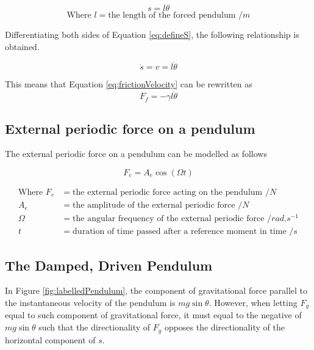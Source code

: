 \documentclass[letterpaper, 12pt]{article}
\begin{document}
\begin{equation} \label{eq:defineS}
    s = l\theta
\end{equation}
\[
    \text{Where } l = \text{the length of the forced pendulum } /\unit{m}
\]

Differentiating both sides of Equation \ref*{eq:defineS},
the following relationship is obtained.

\begin{equation}
    \dot s = v = l \dot \theta
\end{equation}

This means that Equation \ref*{eq:frictionVelocity} can be rewritten as
\begin{equation}
    F_f = -\gamma l \dot\theta
\end{equation}

\subsection{External periodic force on a pendulum}

The external periodic force on a pendulum can be modelled as follows

\begin{equation}
    F_e = A_e \cos (\Omega t)
\end{equation}

\begin{align*}
    \text{Where } F_e & = \text{the external periodic force acting on the pendulum } /\unit{N}
    \\
    A_e               & = \text{the amplitude of the external periodic force } /\unit{N}
    \\
    \Omega            & = \text{the angular frequency of the external periodic force } /\unit{rad.s^{-1}}
    \\
    t                 & = \text{duration of time passed after a reference moment in time } /\unit{s}
\end{align*}

\subsection{The Damped, Driven Pendulum}

In Figure \ref*{fig:labelledPendulum}, the component of
gravitational force parallel to the instantaneous velocity of
the pendulum is \(mg\sin\theta\). However, when letting
\(F_g\) equal to such component of gravitational force,
it must equal to the negative of \(mg\sin\theta\)
such that the directionality of \(F_g\) opposes
the directionality of the horizontal component
of \(s\).
\end{document}
